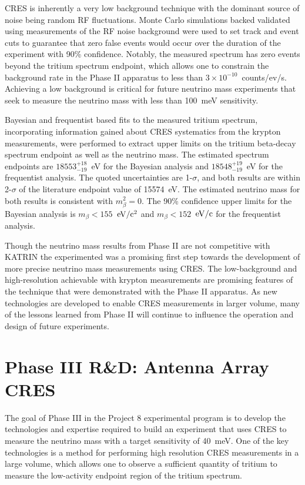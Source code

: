 CRES is inherently a very low background technique with the dominant source of noise being random RF fluctuations. Monte Carlo simulations backed validated using measurements of the RF noise background were used to set track and event cuts to guarantee that zero false events would occur over the duration of the experiment with 90\% confidence. Notably, the measured spectrum has zero events beyond the tritium spectrum endpoint, which allows one to constrain the background rate in the Phase II apparatus to less than $3\times10^{-10}$~counts/ev/s. Achieving a low background is critical for future neutrino mass experiments that seek to measure the neutrino mass with less than 100~meV sensitivity.

Bayesian and frequentist based fits to the measured tritium spectrum, incorporating information gained about CRES systematics from the krypton measurements, were performed to extract upper limits on the tritium beta-decay spectrum endpoint as well as the neutrino mass. The estimated spectrum endpoints are $18553^{+18}_{-19}$~eV for the Bayesian analysis and $18548^{+19}_{-19}$~eV for the frequentist analysis. The quoted uncertainties are 1-$\sigma$, and both results are within 2-$\sigma$ of the literature endpoint value of 15574~eV. The estimated neutrino mass for both results is consistent with $m_\beta^2=0$. The 90\% confidence upper limits for the Bayesian analysis is $m_\beta < 155$~$\rm{eV}/\rm{c}^2$ and $m_\beta < 152$~$\rm{eV}/\rm{c}$ for the frequentist analysis.

Though the neutrino mass results from Phase II are not competitive with KATRIN the experimented was a promising first step towards the development of more precise neutrino mass measurements using CRES. The low-background and high-resolution achievable with krypton measurements are promising features of the technique that were demonstrated with the Phase II apparatus. As new technologies are developed to enable CRES measurements in larger volume, many of the lessons learned from Phase II will continue to influence the operation and design of future experiments.

\section{Phase III R\&D: Antenna Array CRES}
\label{sec:chap3-phaseIII-antenna-arrays}

The goal of Phase III in the Project 8 experimental program is to develop the technologies and expertise required to build an experiment that uses CRES to measure the neutrino mass with a target sensitivity of 40~meV. One of the key technologies is a method for performing high resolution CRES measurements in a large volume, which allows one to observe a sufficient quantity of tritium to measure the low-activity endpoint region of the tritium spectrum. 

